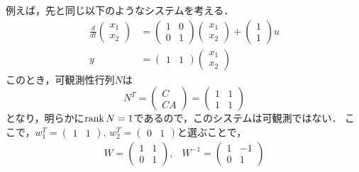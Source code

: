 例えば，先と同じ以下のようなシステムを考える．
\begin{align}
 \frac{d}{dt}
  \left(
   \begin{array}{c}
    x_1 \\
    x_2
   \end{array}
  \right) &= 
  \left(
   \begin{array}{cc}
    1 & 0 \\
    0 & 1
   \end{array}
  \right)
  \left(
   \begin{array}{c}
    x_1 \\
    x_2
   \end{array}
  \right) +
  \left(
   \begin{array}{c}
    1 \\
    1
   \end{array}
  \right) u \\
 y &=
  \left(
   \begin{array}{cc}
    1 & 1
   \end{array}
  \right) 
  \left(
   \begin{array}{c}
    x_1 \\
    x_2
   \end{array}
  \right)
\end{align}
このとき，可観測性行列$N$は
\begin{equation}
 N^T = 
  \left(
   \begin{array}{c}
    C \\
    CA
   \end{array}
  \right) =
  \left(
   \begin{array}{cc}
    1 & 1 \\
    1 & 1
   \end{array}
  \right)
\end{equation}
となり，明らかに$\mathop{\rm rank}\nolimits N = 1$であるので，このシステムは可観測ではない．
ここで，$w_1^T = (\begin{array}{cc}1 & 1\end{array})$, 
$w_2^T = (\begin{array}{cc}0 & 1\end{array})$と選ぶことで，
\begin{equation}
 \begin{array}{cc}
  W =
   \left(
    \begin{array}{cc}
     1 & 1 \\
     0 & 1
    \end{array}
   \right),
   & 
  W^{-1} =
   \left(
    \begin{array}{cc}
     1 & -1 \\
     0 & 1
    \end{array}
   \right)
 \end{array}
\end{equation}
